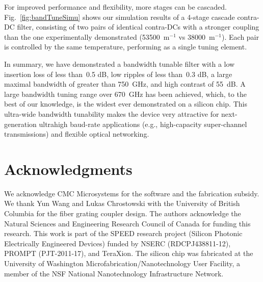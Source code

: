 \documentclass[9pt,twocolumn,twoside]{osajnl}
\begin{document}
For improved performance and flexibility, more stages can be cascaded.
Fig.~\ref{fig:bandTuneSimu} shows our simulation results of a 4-stage cascade contra-DC filter, consisting of two pairs of identical contra-DCs with a stronger coupling than the one experimentally demonstrated (53500~m$^{-1}$ vs 38000~m$^{-1}$). Each pair is controlled by the same temperature, performing as a single tuning element.



In summary, we have demonstrated a bandwidth tunable filter with a low insertion loss of less than~0.5 dB, low ripples of less than~0.3 dB, a large maximal bandwidth of greater than 750~GHz, and high contrast of 55~dB. 
A large bandwidth tuning range over 670~GHz has been achieved, which, to the best of our knowledge, is the widest ever demonstrated on a silicon chip. 
This ultra-wide bandwidth tunability makes the device very attractive for next-generation ultrahigh baud-rate applications (e.g., high-capacity super-channel transmissions) and flexible optical networking. 

\section*{Acknowledgments}
We acknowledge CMC Microsystems for the  software and the fabrication subsidy. We thank Yun Wang and Lukas Chrostowski with the University of British Columbia for the fiber grating coupler design. The authors acknowledge the Natural Sciences and Engineering Research Council of Canada for funding this research. This work is part of the SPEED research project (Silicon Photonic Electrically Engineered Devices) funded by NSERC (RDCPJ438811-12), PROMPT (PJT-2011-17), and TeraXion. The silicon chip was fabricated at the University of Washington Microfabrication/Nanotechnology User Facility, a member of the NSF National Nanotechnology Infrastructure Network.



	
\end{document}
